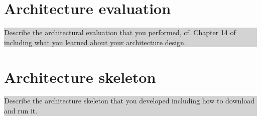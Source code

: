 \documentclass[a4paper,11pt]{report}
\newcommand{\instructions}[1]{
  \noindent\colorbox{lightgray}{%
    \parbox{\linewidth}{%
      #1
    }%
  }%
 \vspace{0.1cm}
}
\begin{document}
\chapter{Architecture evaluation}
\label{cha:arch-eval}
\thispagestyle{fancy}

\instructions{
Describe the architectural evaluation that you performed, cf. Chapter
14 of~\citet{rozanski2011software} including what you learned about
your architecture design.
}

\chapter{Architecture skeleton}
\label{cha:arch-prot}
\thispagestyle{fancy}
\instructions{ 
Describe the architecture skeleton that you developed
  including how to download and run it.
}





% 
% 


\end{document}
